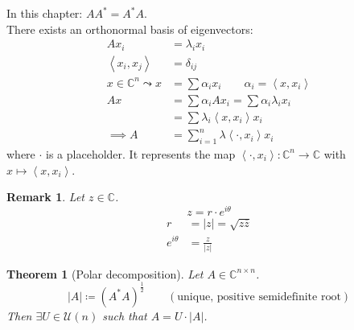 \documentclass[a4paper]{article}
\newcounter{lecref}[section]
\numberwithin{lecref}{section}
\newtheorem{theorem}[lecref]{Theorem}
\newtheorem*{Remark}{Remark}
\newcommand{\angel}[1]{\left\langle#1\right\rangle}
\newcommand{\card}[1]{\left|#1\right|}
\begin{document}
In this chapter: $AA^* = A^* A$. \\
There exists an orthonormal basis of eigenvectors:
\begin{align*}
  Ax_i &= \lambda_i x_i \\
  \angel{x_i, x_j} &= \delta_{ij} \\
  x \in \mathbb C^n \leadsto x &= \sum \alpha_i x_i \qquad \alpha_i = \angel{x, x_i} \\
  Ax &= \sum \alpha_i Ax_i = \sum \alpha_i \lambda_i x_i \\
    &= \sum \lambda_i \angel{x, x_i} x_i \\
  \implies A &= \sum_{i=1}^n \lambda \angel{\cdot, x_i} x_i
\end{align*}
where $\cdot$ is a placeholder. It represents the map $\angel{\cdot, x_i}: \mathbb C^n \to \mathbb C$ with $x \mapsto \angel{x, x_i}$.

\begin{Remark}
  Let $z \in \mathbb C$.
  \[ z = r \cdot e^{i \theta} \]
  \begin{align*}
    r &= \card{z} = \sqrt{z \overline{z}} \\
    e^{i \theta} &= \frac{z}{\card{z}}
  \end{align*}
\end{Remark}

\begin{theorem}[Polar decomposition] %
  Let $A \in \mathbb C^{n \times n}$.
  \[ \card{A} \coloneqq (A^* A)^{\frac12} \qquad (\text{unique, positive semidefinite root}) \]
  Then $\exists U \in \mathcal U(n)$ such that $A = U \cdot \card{A}$.
\end{theorem}
\end{document}
